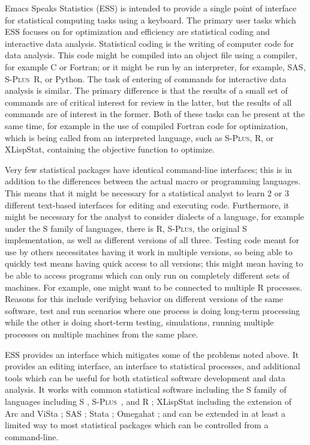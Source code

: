 \documentclass{article}
\newcommand*{\Splus}{\textsc{S-Plus}}
\begin{document}
Emacs Speaks Statistics (ESS) is intended to provide a single point of
interface for statistical computing tasks using a keyboard.  The
primary user tasks which ESS focuses on for optimization and
efficiency are statistical coding and interactive data analysis.
Statistical coding is the writing of computer code for data analysis.
This code might be compiled into an object file using a compiler, for
example C or Fortran; or it might be run by an interpreter, for
example, SAS, \Splus\, R, or Python.  The task of entering of commands
for interactive data analysis is similar.  The primary difference is
that the results of a small set of commands are of critical interest
for review in the latter, but the results of all commands are of
interest in the former.  Both of these tasks can be present at the
same time, for example in the use of compiled Fortran code for
optimization, which is being called from an interpreted language, such
as \Splus, R, or XLispStat, containing the objective function to
optimize.

Very few statistical packages have identical command-line interfaces;
this is in addition to the differences between the actual macro or
programming languages.  This means that it might be necessary for a
statistical analyst to learn 2 or 3 different text-based interfaces
for editing and executing code.  Furthermore, it might be necessary
for the analyst to consider dialects of a language, for example under
the S family of languages, there is R, \Splus, the original S
implementation, as well as different versions of all three.  Testing
code meant for use by others necessitates having it work in multiple
versions, so being able to quickly test means having quick access to
all versions; this might mean having to be able to access programs
which can only run on completely different sets of machines.  For
example, one might want to be connected to multiple R processes.
Reasons for this include verifying behavior on different versions of
the same software, test and run scenarios where one process is doing
long-term processing while the other is doing short-term testing,
simulations, running multiple processes on multiple machines from the
same place.

ESS provides an interface which mitigates some of the problems noted
above.  It provides an editing interface, an interface to statistical
processes, and additional tools which can be useful for both
statistical software development and data analysis.  It works with
common statistical software including the S family of languages
including S \citep{BecRCW88,ChaJH92,ChaJ98}, \Splus\ \citep{Splus},
and R \citep{ihak:gent:1996}; XLispStat \citep{Tier90} including the
extension of Arc \citep{Cook:Weisberg:1999} and ViSta
\citep{youn:fald:mcfa:1992}; SAS \citep{SAS:8.0}; Stata
\citep{Stata:6.0}; Omegahat \citep{DTLang:2000}; and can be extended
in at least a limited way to most statistical packages which can be
controlled from a command-line.
\end{document}
